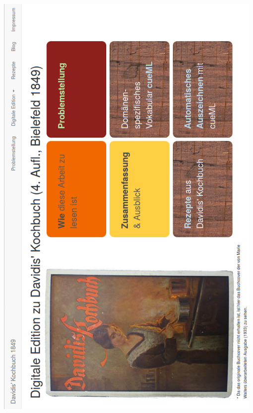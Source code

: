 \documentclass[12pt, twoside]{report}
\begin{document}
\clearpage
{}
\includegraphics[width=0.98\textwidth]{WebseitenFuerDenDruck/0.png}










\end{document}
